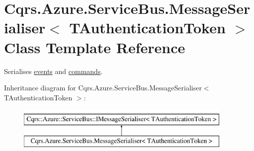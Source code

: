 \hypertarget{classCqrs_1_1Azure_1_1ServiceBus_1_1MessageSerialiser}{}\section{Cqrs.\+Azure.\+Service\+Bus.\+Message\+Serialiser$<$ T\+Authentication\+Token $>$ Class Template Reference}
\label{classCqrs_1_1Azure_1_1ServiceBus_1_1MessageSerialiser}


Serialises \hyperlink{}{events} and \hyperlink{}{commands}.  


Inheritance diagram for Cqrs.\+Azure.\+Service\+Bus.\+Message\+Serialiser$<$ T\+Authentication\+Token $>$\+:\begin{figure}[H]
\begin{center}
\leavevmode
\includegraphics[height=2.000000cm]{classCqrs_1_1Azure_1_1ServiceBus_1_1MessageSerialiser}
\end{center}
\end{figure}
